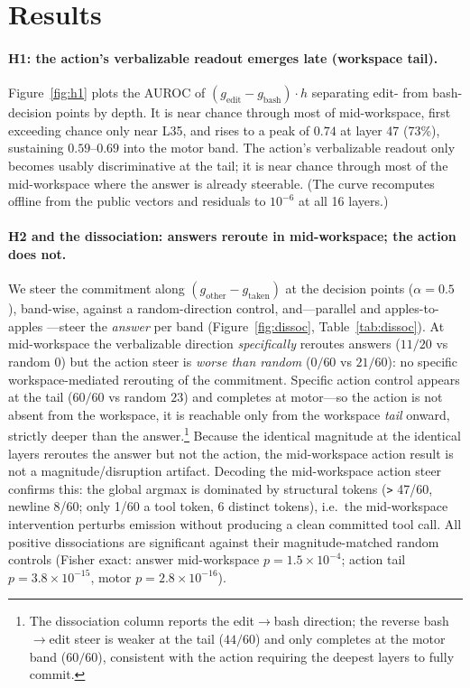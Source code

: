 \documentclass[11pt]{article}
\begin{document}
\section{Results}
\paragraph{H1: the action's verbalizable readout emerges late (workspace tail).}
Figure~\ref{fig:h1} plots the AUROC of $(g_{\text{edit}}-g_{\text{bash}})\!\cdot h$ separating edit-
from bash-decision points by depth. It is near chance through most of mid-workspace, first exceeding
chance only near L35, and rises to a peak of $0.74$ at layer 47 (73\%), sustaining $0.59$--$0.69$ into
the motor band. The action's verbalizable readout only becomes usably discriminative at the tail; it
is near chance through most of the mid-workspace where the answer is already steerable.
(The curve recomputes offline from the
public vectors and residuals to $10^{-6}$ at all 16 layers.)

\paragraph{H2 and the dissociation: answers reroute in mid-workspace; the action does not.}
We steer the commitment along $(g_{\text{other}}-g_{\text{taken}})$ at the decision points
($\alpha{=}0.5$), band-wise, against a random-direction control, and---parallel and apples-to-apples
---steer the \emph{answer} per band (Figure~\ref{fig:dissoc}, Table~\ref{tab:dissoc}). At mid-workspace
the verbalizable direction \emph{specifically} reroutes answers ($11/20$ vs random $0$) but the action
steer is \emph{worse than random} ($0/60$ vs $21/60$): no specific workspace-mediated rerouting of the
commitment. Specific action control appears at the tail ($60/60$ vs random $23$) and completes at motor---so the
action is not absent from the workspace, it is reachable only from the workspace \emph{tail} onward,
strictly deeper than the answer.\footnote{The dissociation column reports the edit$\rightarrow$bash
direction; the reverse bash$\rightarrow$edit steer is weaker at the tail ($44/60$) and only completes
at the motor band ($60/60$), consistent with the action requiring the deepest layers to fully commit.} Because the identical magnitude at the identical layers reroutes the
answer but not the action, the mid-workspace action result is not a magnitude/disruption artifact.
Decoding the mid-workspace action steer confirms this: the global argmax is dominated by structural
tokens (\texttt{>} 47/60, newline 8/60; only 1/60 a tool token, 6 distinct tokens), i.e.\ the
mid-workspace intervention perturbs emission without producing a clean committed tool call. All
positive dissociations are significant against their magnitude-matched random controls (Fisher exact:
answer mid-workspace $p{=}1.5\times10^{-4}$; action tail $p{=}3.8\times10^{-15}$, motor
$p{=}2.8\times10^{-16}$).
\end{document}
